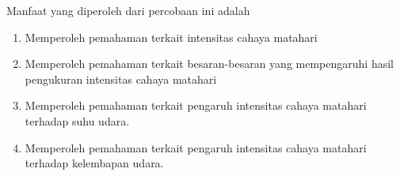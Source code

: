 Manfaat yang diperoleh dari percobaan ini adalah
\begin{enumerate}
    \item Memperoleh pemahaman terkait intensitas cahaya matahari
    \item Memperoleh pemahaman terkait besaran-besaran yang mempengaruhi hasil pengukuran intensitas cahaya matahari
    \item Memperoleh pemahaman terkait pengaruh intensitas cahaya matahari terhadap suhu udara.
    \item Memperoleh pemahaman terkait pengaruh intensitas cahaya matahari terhadap kelembapan udara.
\end{enumerate}
